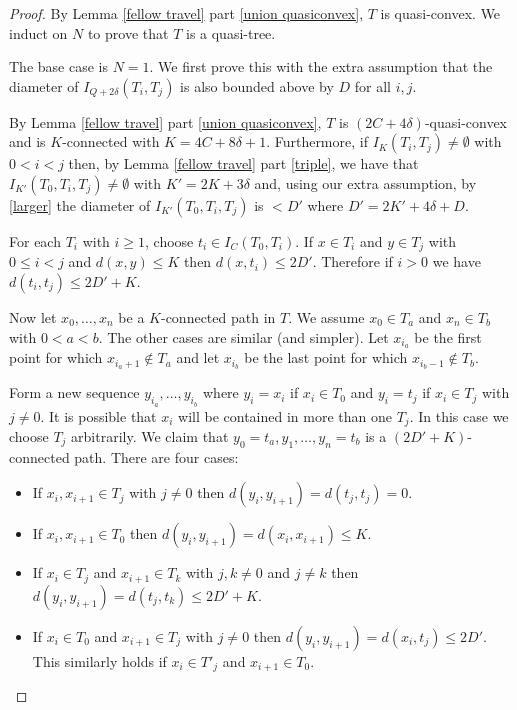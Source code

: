 \documentclass[10pt,a4paper]{amsart}
\begin{document}
\begin{proof}
By Lemma \ref{fellow travel} part \eqref{union quasiconvex}, $T$ is quasi-convex. We induct on $N$ to prove that $T$ is a quasi-tree.

The base case is $N=1$. We first prove this with the extra assumption that the diameter of $I_{Q+2\delta}(T_i, T_j)$ is also bounded above by $D$ for all
$i,j$.


By Lemma \ref{fellow travel} part \eqref{union quasiconvex}, $T$ is $(2C+4\delta)$-quasi-convex and is $K$-connected with $K = 4C + 8\delta +1$.
Furthermore, if $I_K(T_i, T_j) \neq \emptyset$ with $0<i<j$ then, by Lemma \ref{fellow travel} part \eqref{triple}, we have that $I_{K'}(T_0, T_i, T_j) \neq \emptyset$ with $K' = 2K+3\delta$ and, using our extra assumption, by \eqref{larger} the diameter of $I_{K'}(T_0, T_i, T_j)$ is $< D'$ where $D' = 2K'+4\delta + D$.


For each $T_i$ with $i\ge1$, choose $t_i \in  I_{C}(T_0, T_i)$. If $x \in T_i$ and $y \in T_j$ with $0\le i<j$ and $d(x,y) \le K$ then $d(x, t_i) \le 2D'$. Therefore if $i> 0$ we have $d(t_i, t_j) \le 2D' +K$.

Now let $x_0, \dots, x_n$ be a $K$-connected path in $T$. We assume $x_0 \in T_a$ and $x_n \in T_b$ with $0<a<b$. The other cases are similar (and simpler). Let $x_{i_a}$ be the first point for which $x_{i_a+1} \not\in  T_a$ and let $x_{i_b}$ be the last point for which $x_{i_b-1} \not\in T_b$.

Form a new sequence $y_{i_a}, \dots, y_{i_b}$ where $y_i = x_i$ if $x_i \in T_0$ and $y_i = t_j$ if $x_i \in T_j$ with $j \neq 0$. It is possible that $x_i$ will be contained in more than one $T_j$. In this case we choose $T_j$ arbitrarily. We claim that $y_0 = t_a, y_1, \dots, y_n = t_b$ is a $(2D'+K)$-connected path. There are four cases:
\begin{itemize}
\item If $x_i, x_{i+1} \in T_j$ with $j \neq 0$ then $d(y_i, y_{i+1}) = d(t_j, t_j) = 0$. 
\item If $x_i, x_{i+1} \in T_0$ then $d(y_i,y_{i+1})= d(x_i, x_{i+1}) \le K$.
\item If $x_i \in T_j$ and $x_{i+1} \in T_k$ with $j,k\neq 0$ and $j\neq k$ then $d(y_i, y_{i+1}) = d(t_j, t_k) \le 2D'+K$.
\item If $x_i \in T_0$ and $x_{i+1} \in T_j$ with $j\neq 0$ then $d(y_i, y_{i+1}) = d(x_i,t_j) \le 2D'$. This similarly holds if $x_i \in T'_j$ and $x_{i+1} \in T_0$.
\end{itemize}


\end{proof}
\end{document}
